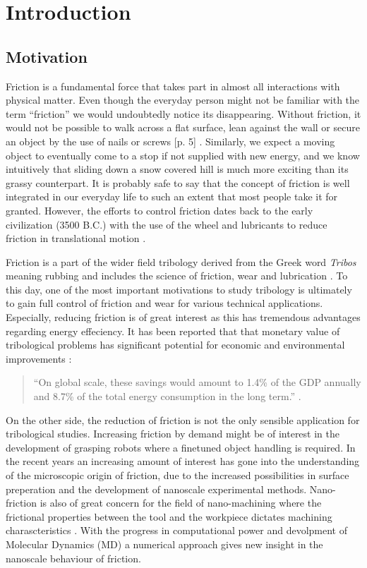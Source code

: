\chapter{Introduction}
\section{Motivation}

Friction is a fundamental force that takes part in almost all interactions with
physical matter. Even though the everyday person might not be familiar with the
term ``friction'' we would undoubtedly notice its disappearing. Without
friction, it would not be possible to walk across a flat surface, lean against
the wall or secure an object by the use of nails or screws [p. 5]
\cite{gnecco_meyer_2015}. Similarly, we expect a moving object to eventually
come to a stop if not supplied with new energy, and we know intuitively that
sliding down a snow covered hill is much more exciting than its grassy
counterpart. It is probably safe to say that the concept of friction is well
integrated in our everyday life to such an extent that most people take it for
granted. However, the efforts to control friction dates back to the early
civilization (3500 B.C.) with the use of the wheel and lubricants to reduce
friction in translational motion \cite{bhushan_2013}. 

Friction is a part of the wider field tribology derived from the Greek word
\textit{Tribos} meaning rubbing and includes the science of friction, wear and
lubrication \cite{bhushan_2013}. To this day, one of the most important motivations to study
tribology is ultimately to gain full control of friction and wear for various
technical applications. Especially, reducing friction is of great interest as
this has tremendous advantages regarding energy effeciency. It has been reported
that that monetary value of tribological problems has significant potential for
economic and environmental improvements \cite{kim_nano-scale_2009}:
\begin{quote}
    ``On global scale, these savings would amount to 1.4\% of the GDP annually
    and 8.7\% of the total energy consumption in the long term.''
    \cite{holmberg_influence_2017}. 
\end{quote}
On the other side, the reduction of friction is not the only sensible application for tribological studies. Increasing friction by demand might be of interest in the development of grasping robots where a finetuned object handling is required. In the recent years an increasing amount of interest has gone into the understanding of the microscopic origin of friction, due to the increased possibilities in surface preperation and the development of nanoscale experimental methods. Nano-friction is also of great concern for the field of nano-machining where the frictional properties between the tool and the workpiece dictates machining charascteristics \cite{kim_nano-scale_2009}. With the progress in computational power and devolpment of Molecular Dynamics (\acrshort{MD}) a numerical approach gives new insight in the nanoscale behaviour of friction.




